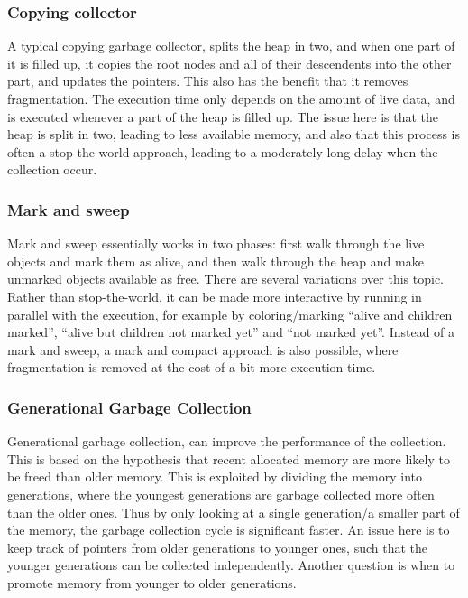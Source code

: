 \documentclass[11pt]{report}
\begin{document}
\subsubsection{Copying collector}
A typical copying garbage collector, splits the heap in two, and when one part of it is filled up, it copies the root nodes and all of their descendents into the other part, and updates the pointers.  This also has the benefit that it removes fragmentation. 
The execution time only depends on the amount of live data, and is executed whenever a part of the heap is filled up.
The issue here is that the heap is split in two, leading to less available memory, and also that this process is often a stop-the-world approach, leading to a moderately long delay when the collection occur.

\subsubsection{Mark and sweep}
Mark and sweep essentially works in two phases: first walk through the live objects and mark them as alive, and then walk through the heap and make unmarked objects available as free.
There are several variations over this topic. Rather than stop-the-world, it can be made more interactive by running in parallel with the execution, for example by coloring/marking ``alive and children marked'', ``alive but children not marked yet'' and ``not marked yet''.
Instead of a mark and sweep, a mark and compact approach is also possible, where fragmentation is removed at the cost of a bit more execution time.

\subsubsection{Generational Garbage Collection}
\label{generational-gc}
Generational garbage collection, can improve the performance of the collection. This is based on the hypothesis that recent allocated memory are more likely to be freed than older memory.
This is exploited by dividing the memory into generations, where the youngest generations are garbage collected more often than the older ones. 
Thus by only looking at a single generation/a smaller part of the memory, the garbage collection cycle is significant faster.
An issue here is to keep track of pointers from older generations to younger ones, such that the younger generations can be collected independently.
Another question is when to promote memory from younger to older generations.
\end{document}
